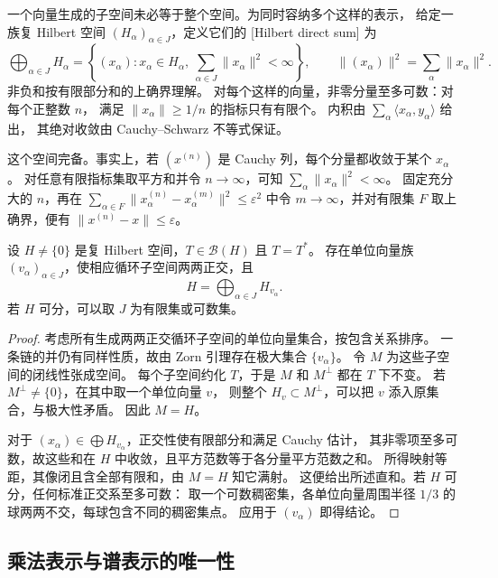 一个向量生成的子空间未必等于整个空间。为同时容纳多个这样的表示，
给定一族复 Hilbert 空间 \((H_\alpha)_{\alpha\in J}\)，定义它们的
[Hilbert direct sum] 为
\[
 \bigoplus_{\alpha\in J}H_\alpha
 =\left\{(x_\alpha):x_\alpha\in H_\alpha,
   \ \sum_{\alpha\in J}\|x_\alpha\|^2<\infty\right\},
 \qquad
 \|(x_\alpha)\|^2=\sum_\alpha\|x_\alpha\|^2.
\]
非负和按有限部分和的上确界理解。
对每个这样的向量，非零分量至多可数：对每个正整数 \(n\)，
满足 \(\|x_\alpha\|\geq1/n\) 的指标只有有限个。
内积由 \(\sum_\alpha\langle x_\alpha,y_\alpha\rangle\) 给出，
其绝对收敛由 Cauchy--Schwarz 不等式保证。

\ProseParagraphBreak

这个空间完备。事实上，若 \((x^{(n)})\) 是 Cauchy 列，每个分量都收敛于某个 \(x_\alpha\)。
对任意有限指标集取平方和并令 \(n\to\infty\)，可知 \(\sum_\alpha\|x_\alpha\|^2<\infty\)。
固定充分大的 \(n\)，再在
\(\sum_{\alpha\in F}\|x_\alpha^{(n)}-x_\alpha^{(m)}\|^2\leq\varepsilon^2\)
中令 \(m\to\infty\)，并对有限集 \(F\) 取上确界，便有 \(\|x^{(n)}-x\|\leq\varepsilon\)。

\begin{theorem}[正交循环分解]
\label{b1:thm:29-cyclic-decomposition}
设 \(H\ne\{0\}\) 是复 Hilbert 空间，\(T\in\mathcal B(H)\) 且 \(T=T^*\)。
存在单位向量族 \((v_\alpha)_{\alpha\in J}\)，使相应循环子空间两两正交，且
\[
 H=\bigoplus_{\alpha\in J}H_{v_\alpha}.
\]
若 \(H\) 可分，可以取 \(J\) 为有限集或可数集。
\end{theorem}
\begin{proof}
考虑所有生成两两正交循环子空间的单位向量集合，按包含关系排序。
一条链的并仍有同样性质，故由 Zorn 引理存在极大集合 \(\{v_\alpha\}\)。
令 \(M\) 为这些子空间的闭线性张成空间。
每个子空间约化 \(T\)，于是 \(M\) 和 \(M^\perp\) 都在 \(T\) 下不变。
若 \(M^\perp\ne\{0\}\)，在其中取一个单位向量 \(v\)，
则整个 \(H_v\subset M^\perp\)，可以把 \(v\) 添入原集合，与极大性矛盾。
因此 \(M=H\)。

对于 \((x_\alpha)\in\bigoplus H_{v_\alpha}\)，正交性使有限部分和满足 Cauchy 估计，
其非零项至多可数，故这些和在 \(H\) 中收敛，且平方范数等于各分量平方范数之和。
所得映射等距，其像闭且含全部有限和，由 \(M=H\) 知它满射。
这便给出所述直和。若 \(H\) 可分，任何标准正交系至多可数：
取一个可数稠密集，各单位向量周围半径 \(1/3\) 的球两两不交，每球包含不同的稠密集点。
应用于 \((v_\alpha)\) 即得结论。
\end{proof}

\subsection{乘法表示与谱表示的唯一性}
\label{b1:subsec:290304}

